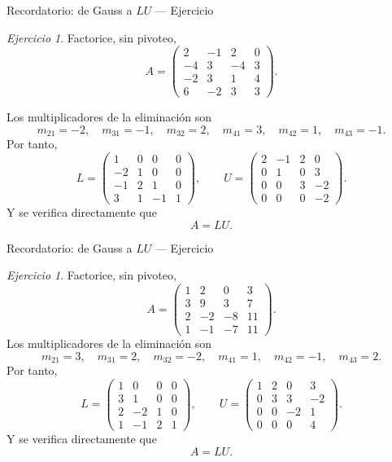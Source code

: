\documentclass[aspectratio=169,11pt]{beamer}
\theoremstyle{remark}
\newtheorem{Ejer}[definicion]{Ejercicio}
\begin{document}
\begin{frame}[shrink=5]{Recordatorio: de Gauss a $LU$ — Ejercicio}
\footnotesize
\begin{Ejer}

Factorice, sin pivoteo,
\[
A=\begin{pmatrix}2 & -1 & 2 & 0\\-4 & 3 & -4 & 3\\-2 & 3 & 1 & 4\\6 & -2 & 3 & 3\end{pmatrix}.
\]

Los multiplicadores de la eliminación son
\[
m_{21}=-2,\quad m_{31}=-1,\quad m_{32}=2,\quad m_{41}=3,\quad m_{42}=1,\quad m_{43}=-1.
\]
Por tanto,
\[
L=\begin{pmatrix}1 & 0 & 0 & 0\\-2 & 1 & 0 & 0\\-1 & 2 & 1 & 0\\3 & 1 & -1 & 1\end{pmatrix},\qquad U=\begin{pmatrix}2 & -1 & 2 & 0\\0 & 1 & 0 & 3\\0 & 0 & 3 & -2\\0 & 0 & 0 & -2\end{pmatrix}.
\]
Y se verifica directamente que
\[
\boxed{A=LU}.
\]
\end{Ejer}
\end{frame}

\begin{frame}[shrink=5]{Recordatorio: de Gauss a $LU$ — Ejercicio}
\footnotesize
\begin{Ejer}
Factorice, sin pivoteo,
\[
A=\begin{pmatrix}1 & 2 & 0 & 3\\3 & 9 & 3 & 7\\2 & -2 & -8 & 11\\1 & -1 & -7 & 11\end{pmatrix}.
\]
Los multiplicadores de la eliminación son
\[
m_{21}=3,\quad m_{31}=2,\quad m_{32}=-2,\quad m_{41}=1,\quad m_{42}=-1,\quad m_{43}=2.
\]
Por tanto,
\[
L=\begin{pmatrix}1 & 0 & 0 & 0\\3 & 1 & 0 & 0\\2 & -2 & 1 & 0\\1 & -1 & 2 & 1\end{pmatrix},\qquad U=\begin{pmatrix}1 & 2 & 0 & 3\\0 & 3 & 3 & -2\\0 & 0 & -2 & 1\\0 & 0 & 0 & 4\end{pmatrix}.
\]
Y se verifica directamente que
\[
\boxed{A=LU}.
\]
\end{Ejer}
\end{frame}
\end{document}
